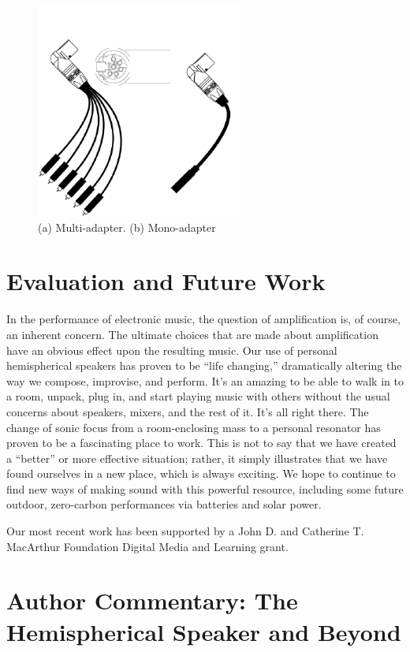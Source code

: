 \begin{figure}[t]
\centering
\includegraphics[width=70mm]{img-20-eps-converted-to-crop.pdf}
\caption{(a) Multi-adapter. (b) Mono-adapter}
\label{Smallwood:img-20}
\end{figure}

\section{Evaluation and Future Work}

In the performance of electronic music, the question of amplification is, of
course, an inherent concern.  The ultimate choices that are made about
amplification have an obvious effect upon the resulting music.  Our use of
personal hemispherical speakers has proven to be ``life changing,'' dramatically
altering the way we compose, improvise, and perform. It's an amazing to be able
to walk in to a room, unpack, plug in, and start playing music with others
without the usual concerns about speakers, mixers, and the rest of it.  It's all
right there. The change of sonic focus from a room-enclosing mass to a personal
resonator  has proven to be a fascinating place to work.  This is not to say that
we have created a ``better'' or more effective situation; rather, it simply
illustrates that we have found ourselves in a new place, which is always
exciting.  We hope to continue to find new ways of making sound with this
powerful resource, including some future outdoor, zero-carbon performances via
batteries and solar power.

\begin{acknowledgement}
Our most recent work has been supported by a John D. and Catherine T. MacArthur
Foundation Digital Media and Learning grant.
\end{acknowledgement}


\section*{Author Commentary: The Hemispherical Speaker and Beyond}

